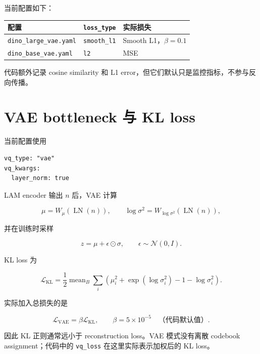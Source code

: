 \documentclass[UTF8,a4paper,11pt]{ctexart}
\begin{document}
当前配置如下：

\begin{center}
\begin{tabular}{lll}
\toprule
配置 & \texttt{loss\_type} & 实际损失 \\
\midrule
\texttt{dino\_large\_vae.yaml} & \texttt{smooth\_l1} & Smooth L1，$\beta=0.1$ \\
\texttt{dino\_base\_vae.yaml} & \texttt{l2} & MSE \\
\bottomrule
\end{tabular}
\end{center}

代码额外记录 cosine similarity 和 L1 error，但它们默认只是监控指标，不参与反向传播。

\section{VAE bottleneck 与 KL loss}

当前配置使用

\begin{verbatim}
vq_type: "vae"
vq_kwargs:
  layer_norm: true
\end{verbatim}

LAM encoder 输出 $n$ 后，VAE 计算

\begin{equation*}
\mu=W_\mu(\operatorname{LN}(n)),\qquad
\log\sigma^2=W_{\log\sigma^2}(\operatorname{LN}(n)),
\end{equation*}

并在训练时采样

\begin{equation*}
z=\mu+\epsilon\odot\sigma,
\qquad \epsilon\sim\mathcal{N}(0,I).
\end{equation*}

KL loss 为

\begin{equation}
\mathcal{L}_{\mathrm{KL}}
=\frac{1}{2}\operatorname{mean}_B
\sum_i\left(\mu_i^2+\exp(\log\sigma_i^2)-1-\log\sigma_i^2\right).
\end{equation}

实际加入总损失的是

\begin{equation}
\mathcal{L}_{\mathrm{VAE}}=\beta\mathcal{L}_{\mathrm{KL}},
\qquad \beta=5\times10^{-5}\quad\text{（代码默认值）}.
\end{equation}

因此 KL 正则通常远小于 reconstruction loss。VAE 模式没有离散 codebook assignment；代码中的 \texttt{vq\_loss} 在这里实际表示加权后的 KL loss。
\end{document}
